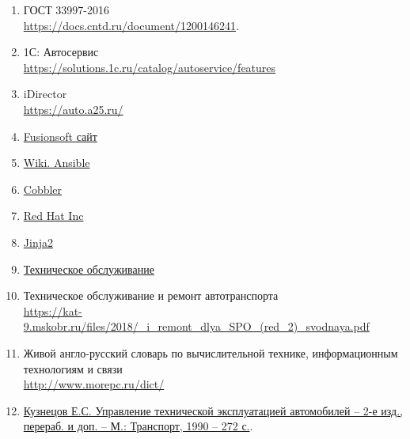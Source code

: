 \begin{enumerate}
	\item ГОСТ 33997-2016 \\
	\url{https://docs.cntd.ru/document/1200146241}.
		\label{ref:ГОСТ-требования-то}

	\item 1С: Автосервис\\
		\url{https://solutions.1c.ru/catalog/autoservice/features}
		\label{ref:1С-автосервис}

	\item iDirector\\
		\url{https://auto.a25.ru/}
		\label{ref:iDirector}

    \item \href{https://www.fusionsoft.ru}
        {Fusionsoft сайт}
		\label{ref:fs}

    \item \href{https://ru.wikipedia.org/wiki/Ansible}
        {Wiki. Ansible}
		\label{ref:wiki-ansible}

    \item \href{https://cobbler.github.io/}
        {Cobbler}
		\label{ref:cobbler}

    \item \href{https://www.redhat.com/en}
        {Red Hat Inc}
		\label{ref:redhat}

    \item \href{https://jinja.palletsprojects.com/en/3.1.x/}
        {Jinja2}
		\label{ref:jinja2}

	\item \href{http://абсолютпб.рф/техническое-обслуживание}{Техническое
		обслуживание}
		\label{ref:техническое-обслуживание}

	\item Техническое обслуживание и ремонт автотранспорта \\
		\url{https://kat-9.mskobr.ru/files/2018/_i_remont_dlya_SPO_(red_2)_svodnaya.pdf}
		\label{ref:му-ремонт-и-техническое-обслуживание}

	\item Живой англо-русский словарь по вычислительной технике, информационным технологиям и связи\\
		\url{http://www.morepc.ru/dict/}
		\label{ref:календарное-планирование}

    \item
        \href{http://rusautomobile.ru/wp-content/uploads/dop_materials/books/03.12.2015/6/KuznetsovESUpravlenietehnicheskojekspluatatsiejavtomobilej(MTransport1990).pdf}%
        {Кузнецов Е.С. Управление технической эксплуатацией автомобилей --
        2-е изд., перераб. и доп. -- М.: Транспорт, 1990 -- 272 с.}.
        \label{ref:кузнецов}


\end{enumerate}
